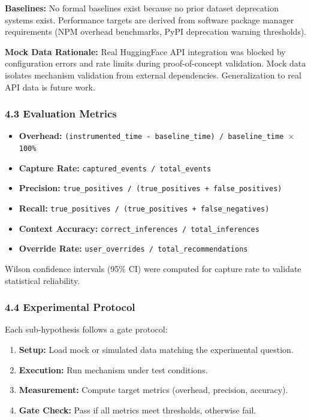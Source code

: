 \textbf{Baselines:} No formal baselines exist because no prior dataset deprecation systems exist. Performance targets are derived from software package manager requirements (NPM overhead benchmarks, PyPI deprecation warning thresholds).

\textbf{Mock Data Rationale:} Real HuggingFace API integration was blocked by configuration errors and rate limits during proof-of-concept validation. Mock data isolates mechanism validation from external dependencies. Generalization to real API data is future work.

\subsubsection{4.3 Evaluation Metrics}

\begin{itemize}
\item \textbf{Overhead:} \texttt{(instrumented\_time - baseline\_time) / baseline\_time $\times$ 100\%}
\item \textbf{Capture Rate:} \texttt{captured\_events / total\_events}
\item \textbf{Precision:} \texttt{true\_positives / (true\_positives + false\_positives)}
\item \textbf{Recall:} \texttt{true\_positives / (true\_positives + false\_negatives)}
\item \textbf{Context Accuracy:} \texttt{correct\_inferences / total\_inferences}
\item \textbf{Override Rate:} \texttt{user\_overrides / total\_recommendations}
\end{itemize}

Wilson confidence intervals (95\% CI) were computed for capture rate to validate statistical reliability.

\subsubsection{4.4 Experimental Protocol}

Each sub-hypothesis follows a gate protocol:
\begin{enumerate}
\item \textbf{Setup:} Load mock or simulated data matching the experimental question.
\item \textbf{Execution:} Run mechanism under test conditions.
\item \textbf{Measurement:} Compute target metrics (overhead, precision, accuracy).
\item \textbf{Gate Check:} Pass if all metrics meet thresholds, otherwise fail.
\end{enumerate}

